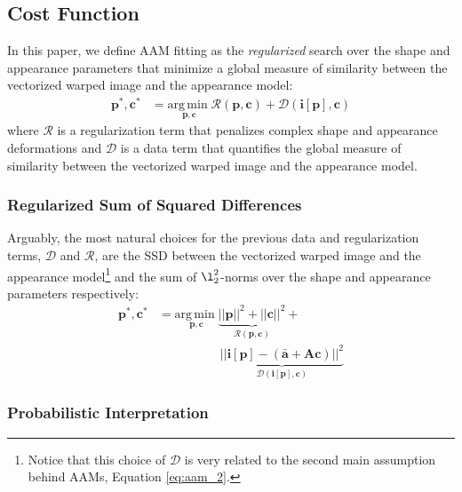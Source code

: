 \subsection{Cost Function}
\label{sec:cost}

In this paper, we define AAM fitting as the \emph{regularized} search over the shape and appearance parameters that minimize a global measure of similarity between the vectorized warped image and the appearance model:
\begin{equation}
    \begin{aligned}
        \mathbf{p}^*, \mathbf{c}^* & = \underset{\mathbf{p}, \mathbf{c}} {\mathrm{arg\, min\;}} \mathcal{R} (\mathbf{p}, \mathbf{c}) + \mathcal{D} (\mathbf{i}[\mathbf{p}], \mathbf{c}) 
        \end{aligned}
    \label{eq:aam_fitting}
\end{equation}
where $\mathcal{R}$ is a regularization term that penalizes complex shape and appearance deformations and $\mathcal{D}$ is a data term that
quantifies the global measure of similarity between the vectorized warped image and the appearance model.

\subsubsection{Regularized Sum of Squared Differences}
\label{sec:rssd}

Arguably, the most natural choices for the previous data and regularization terms, $\mathcal{D}$ and $\mathcal{R}$, are the SSD between the vectorized warped image and the appearance model\footnote{Notice that this choice of $\mathcal{D}$ is very related to the second main assumption behind AAMs, Equation \ref{eq:aam_2}.} and the sum of $\l_2^2$-norms over the shape and appearance parameters respectively:
\begin{equation}
    \begin{aligned}
        \mathbf{p}^*, \mathbf{c}^* & = \underset{\mathbf{p}, \mathbf{c}} {\mathrm{arg\, min\;}} \underbrace{||\mathbf{p}||^2 + ||\mathbf{c}||^2}_{\mathcal{R} (\mathbf{p}, \mathbf{c})} +
        \\
        & \qquad \qquad \quad \underbrace{|| \mathbf{i}[\mathbf{p}] - (\mathbf{\bar{a}} + \mathbf{A} \mathbf{c}) ||^2}_{\mathcal{D} (\mathbf{i}[\mathbf{p}], \mathbf{c})}
    \end{aligned}
    \label{eq:rssd}
\end{equation}
\subsubsection*{Probabilistic Interpretation}
\label{sec:rssd_pi}

